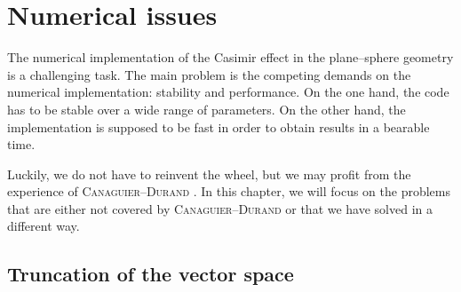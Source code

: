\chapter{Numerical issues}

The numerical implementation of the Casimir effect in the plane--sphere
geometry is a challenging task. The main problem is the competing demands on
the numerical implementation: stability and performance. On the one hand, the
code has to be stable over a wide range of parameters. On the other hand, the
implementation is supposed to be fast in order to obtain results in a bearable
time.

Luckily, we do not have to reinvent the wheel, but we may profit from the
experience of \textsc{Canaguier--Durand} \cite{Durand}. In this chapter, we will
focus on the problems that are either not covered by \textsc{Canaguier--Durand}
or that we have solved in a different way.

\section{Truncation of the vector space}

